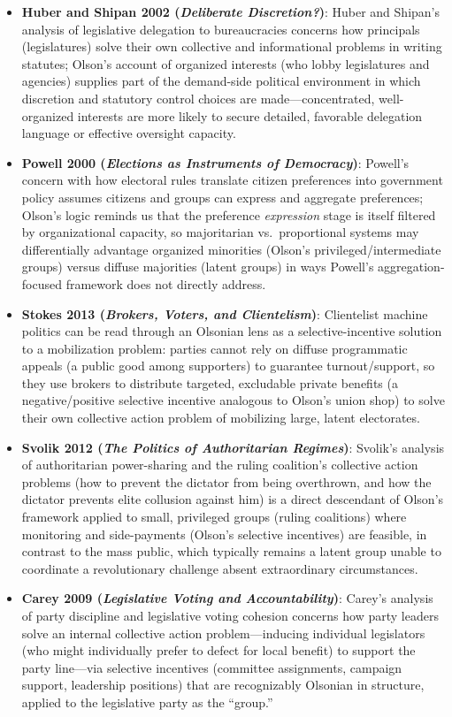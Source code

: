 \documentclass[12pt]{article}
\begin{document}
\begin{itemize}[leftmargin=*, itemsep=4pt]
    \item \textbf{Huber and Shipan 2002 (\textit{Deliberate Discretion?})}: Huber and Shipan's analysis of legislative delegation to bureaucracies concerns how principals (legislatures) solve their own collective and informational problems in writing statutes; Olson's account of organized interests (who lobby legislatures and agencies) supplies part of the demand-side political environment in which discretion and statutory control choices are made---concentrated, well-organized interests are more likely to secure detailed, favorable delegation language or effective oversight capacity.
    \item \textbf{Powell 2000 (\textit{Elections as Instruments of Democracy})}: Powell's concern with how electoral rules translate citizen preferences into government policy assumes citizens and groups can express and aggregate preferences; Olson's logic reminds us that the preference \emph{expression} stage is itself filtered by organizational capacity, so majoritarian vs.\ proportional systems may differentially advantage organized minorities (Olson's privileged/intermediate groups) versus diffuse majorities (latent groups) in ways Powell's aggregation-focused framework does not directly address.
    \item \textbf{Stokes 2013 (\textit{Brokers, Voters, and Clientelism})}: Clientelist machine politics can be read through an Olsonian lens as a selective-incentive solution to a mobilization problem: parties cannot rely on diffuse programmatic appeals (a public good among supporters) to guarantee turnout/support, so they use brokers to distribute targeted, excludable private benefits (a negative/positive selective incentive analogous to Olson's union shop) to solve their own collective action problem of mobilizing large, latent electorates.
    \item \textbf{Svolik 2012 (\textit{The Politics of Authoritarian Regimes})}: Svolik's analysis of authoritarian power-sharing and the ruling coalition's collective action problems (how to prevent the dictator from being overthrown, and how the dictator prevents elite collusion against him) is a direct descendant of Olson's framework applied to small, privileged groups (ruling coalitions) where monitoring and side-payments (Olson's selective incentives) are feasible, in contrast to the mass public, which typically remains a latent group unable to coordinate a revolutionary challenge absent extraordinary circumstances.
    \item \textbf{Carey 2009 (\textit{Legislative Voting and Accountability})}: Carey's analysis of party discipline and legislative voting cohesion concerns how party leaders solve an internal collective action problem---inducing individual legislators (who might individually prefer to defect for local benefit) to support the party line---via selective incentives (committee assignments, campaign support, leadership positions) that are recognizably Olsonian in structure, applied to the legislative party as the ``group.''
\end{itemize}
\end{document}
